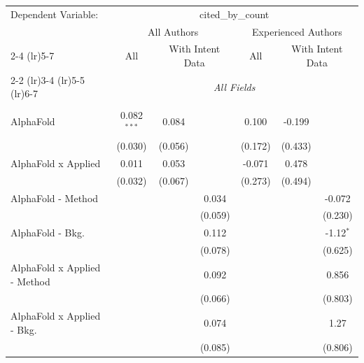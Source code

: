 \begingroup
\centering
\begin{tabular}{lcccccc}
   \tabularnewline \midrule \midrule
   Dependent Variable: & \multicolumn{6}{c}{cited\_by\_count}\\
 & \multicolumn{3}{c}{All Authors} & \multicolumn{3}{c}{Experienced Authors} \\
\cmidrule(lr){2-4} \cmidrule(lr){5-7}
 & \multicolumn{1}{c}{All} & \multicolumn{2}{c}{With Intent Data} & \multicolumn{1}{c}{All} & \multicolumn{2}{c}{With Intent Data} \\
\cmidrule(lr){2-2} \cmidrule(lr){3-4} \cmidrule(lr){5-5} \cmidrule(lr){6-7}
 & \multicolumn{6}{c}{\textit{All Fields}} \\ \\
   AlphaFold                      & 0.082$^{***}$ & 0.084     &              & 0.100         & -0.199       &   \\   
                                  & (0.030)       & (0.056)   &              & (0.172)       & (0.433)      &   \\   
   AlphaFold x Applied            & 0.011         & 0.053     &              & -0.071        & 0.478        &   \\   
                                  & (0.032)       & (0.067)   &              & (0.273)       & (0.494)      &   \\   
   AlphaFold - Method             &               &           & 0.034        &               &              & -0.072\\   
                                  &               &           & (0.059)      &               &              & (0.230)\\   
   AlphaFold - Bkg.               &               &           & 0.112        &               &              & -1.12$^{*}$\\   
                                  &               &           & (0.078)      &               &              & (0.625)\\   
   AlphaFold x Applied - Method   &               &           & 0.092        &               &              & 0.856\\   
                                  &               &           & (0.066)      &               &              & (0.803)\\   
   AlphaFold x Applied - Bkg.     &               &           & 0.074        &               &              & 1.27\\   
                                  &               &           & (0.085)      &               &              & (0.806)\\   

\end{tabular}
